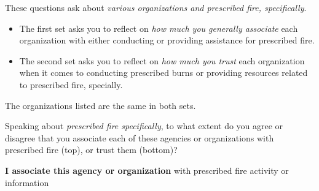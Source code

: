 \documentclass[
  english,
  checkmode = fill,
  ]{sdapsclassic}
\begin{document}
\begin{sloppypar}
\begin{questionnaire}
These questions ask about \emph{various organizations and prescribed fire, specifically}.
\begin{itemize}
\item The first set asks you to reflect on \emph{how much you generally associate} each organization with either conducting or providing assistance for prescribed fire. 
\item The second set asks you to reflect on \emph{how much you trust} each organization when it comes to conducting prescribed burns or providing resources related to prescribed fire, specially.  
\end{itemize}
The organizations listed are the same in both sets.

 Speaking about \emph{prescribed fire specifically}, to what extent do you agree or disagree that you associate each of these agencies or organizations with prescribed fire (top), or trust them (bottom)?   
    
   
      \begin{markgroup}{\textbf{I associate this agency or organization} with prescribed fire activity or information}
         {}~{}
         {}~{}
         {}~{}
         {}~{}
         {}~{}
         {}~{}
         {}~{}
         {}~{}
         {}~{}
         {}~{}
      \end{markgroup}
      

\end{questionnaire}
\end{sloppypar}
\end{document}

